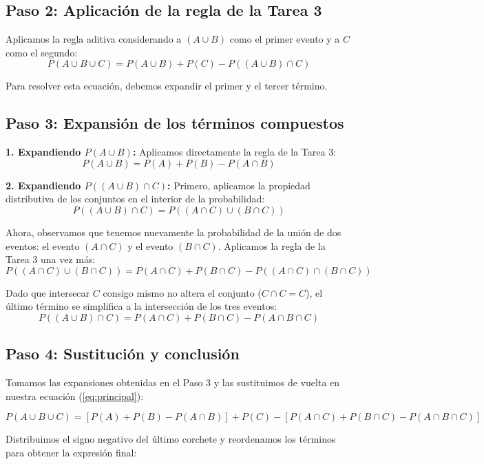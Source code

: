 \documentclass{article}
\begin{document}
    \subsection*{Paso 2: Aplicación de la regla de la Tarea 3}
    Aplicamos la regla aditiva considerando a $(A \cup B)$ como el primer evento y a $C$ como el segundo:
    \begin{equation} \label{eq:principal}
        P(A \cup B \cup C) = P(A \cup B) + P(C) - P((A \cup B) \cap C)
    \end{equation}
    
    Para resolver esta ecuación, debemos expandir el primer y el tercer término.
    
    \subsection*{Paso 3: Expansión de los términos compuestos}
    
    \textbf{1. Expandiendo $P(A \cup B)$:}
    Aplicamos directamente la regla de la Tarea 3:
    $$P(A \cup B) = P(A) + P(B) - P(A \cap B)$$
    
    \textbf{2. Expandiendo $P((A \cup B) \cap C)$:}
    Primero, aplicamos la propiedad distributiva de los conjuntos en el interior de la probabilidad:
    $$P((A \cup B) \cap C) = P((A \cap C) \cup (B \cap C))$$
    
    Ahora, observamos que tenemos nuevamente la probabilidad de la unión de dos eventos: el evento $(A \cap C)$ y el evento $(B \cap C)$. Aplicamos la regla de la Tarea 3 una vez más:
    $$P((A \cap C) \cup (B \cap C)) = P(A \cap C) + P(B \cap C) - P((A \cap C) \cap (B \cap C))$$
    
    Dado que intersecar $C$ consigo mismo no altera el conjunto ($C \cap C = C$), el último término se simplifica a la intersección de los tres eventos:
    $$P((A \cup B) \cap C) = P(A \cap C) + P(B \cap C) - P(A \cap B \cap C)$$
    
    \subsection*{Paso 4: Sustitución y conclusión}
    Tomamos las expansiones obtenidas en el Paso 3 y las sustituimos de vuelta en nuestra ecuación (\ref{eq:principal}):
    
    $$P(A \cup B \cup C) = \left[ P(A) + P(B) - P(A \cap B) \right] + P(C) - \left[ P(A \cap C) + P(B \cap C) - P(A \cap B \cap C) \right]$$
    
    Distribuimos el signo negativo del último corchete y reordenamos los términos para obtener la expresión final:
    
\end{document}
